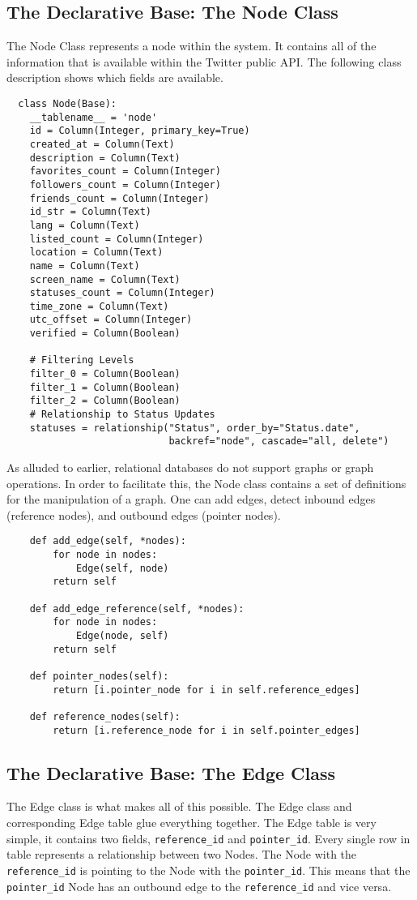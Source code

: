 \subsection{The Declarative Base: The Node Class}
The Node Class represents a node within the system. It contains all of the information that is available within the Twitter public API. The following class description shows which fields are available.
\begin{lstlisting}
  class Node(Base):
    __tablename__ = 'node'
    id = Column(Integer, primary_key=True)
    created_at = Column(Text)
    description = Column(Text)
    favorites_count = Column(Integer)
    followers_count = Column(Integer)
    friends_count = Column(Integer)
    id_str = Column(Text)
    lang = Column(Text)
    listed_count = Column(Integer)
    location = Column(Text)
    name = Column(Text)
    screen_name = Column(Text)
    statuses_count = Column(Integer)
    time_zone = Column(Text)
    utc_offset = Column(Integer)
    verified = Column(Boolean)

    # Filtering Levels
    filter_0 = Column(Boolean)
    filter_1 = Column(Boolean)
    filter_2 = Column(Boolean)
    # Relationship to Status Updates
    statuses = relationship("Status", order_by="Status.date",
                            backref="node", cascade="all, delete")
\end{lstlisting}

As alluded to earlier, relational databases do not support graphs or graph operations. In order to facilitate this, the Node class contains a set of definitions for the manipulation of a graph. One can add edges, detect inbound edges (reference nodes), and outbound edges (pointer nodes).

\begin{lstlisting}
    def add_edge(self, *nodes):
        for node in nodes:
            Edge(self, node)
        return self

    def add_edge_reference(self, *nodes):
        for node in nodes:
            Edge(node, self)
        return self

    def pointer_nodes(self):
        return [i.pointer_node for i in self.reference_edges]

    def reference_nodes(self):
        return [i.reference_node for i in self.pointer_edges]
\end{lstlisting}

\subsection{The Declarative Base: The Edge Class}
The Edge class is what makes all of this possible. The Edge class and corresponding Edge table glue everything together. The Edge table is very simple, it contains two fields, \verb|reference_id| and \verb|pointer_id|. Every single row in table represents a relationship between two Nodes. The Node with the \verb|reference_id| is pointing to the Node with the \verb|pointer_id|. This means that the \verb|pointer_id| Node has an outbound edge to the \verb|reference_id| and vice versa.

